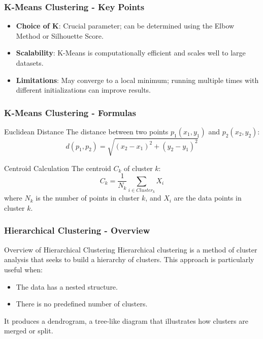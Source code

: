 \documentclass[aspectratio=169]{beamer}
\begin{document}
\begin{frame}[fragile]
    \frametitle{K-Means Clustering - Key Points}
    \begin{itemize}
        \item \textbf{Choice of K}: Crucial parameter; can be determined using the Elbow Method or Silhouette Score.
        \item \textbf{Scalability}: K-Means is computationally efficient and scales well to large datasets.
        \item \textbf{Limitations}: May converge to a local minimum; running multiple times with different initializations can improve results.
    \end{itemize}
\end{frame}

\begin{frame}[fragile]
    \frametitle{K-Means Clustering - Formulas}
    \begin{block}{Euclidean Distance}
        The distance between two points \( p_1 (x_1, y_1) \) and \( p_2 (x_2, y_2) \):
        \[
        d(p_1, p_2) = \sqrt{(x_2 - x_1)^2 + (y_2 - y_1)^2}
        \]
    \end{block}
    
    \begin{block}{Centroid Calculation}
        The centroid \( C_k \) of cluster \( k \):
        \[
        C_k = \frac{1}{N_k} \sum_{i \in Cluster_k} X_i
        \]
        where \( N_k \) is the number of points in cluster \( k \), and \( X_i \) are the data points in cluster \( k \).
    \end{block}
\end{frame}

\begin{frame}[fragile]
    \frametitle{Hierarchical Clustering - Overview}
    \begin{block}{Overview of Hierarchical Clustering}
        Hierarchical clustering is a method of cluster analysis that seeks to build a hierarchy of clusters. 
        This approach is particularly useful when:
        \begin{itemize}
            \item The data has a nested structure.
            \item There is no predefined number of clusters.
        \end{itemize}
        It produces a dendrogram, a tree-like diagram that illustrates how clusters are merged or split.
    \end{block}
\end{frame}
\end{document}
